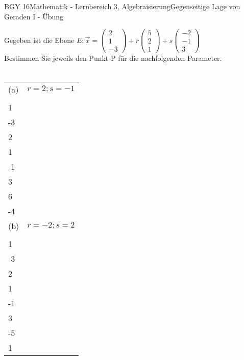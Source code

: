 \documentclass[oneside,openany,headings=optiontotoc,11pt,numbers=noenddot]{scrreprt}
\begin{document}
	\begin{worksheet}{BGY 16}{Mathematik - Lernbereich 3, Algebraisierung}{Gegenseitige Lage von Geraden I - Übung}
				
		\begin{framed}
			\noindent
			Gegeben ist die Ebene \(E: \vec{x} = \left(\begin{array}{c}2\\1\\-3\end{array}\right) + r\left(\begin{array}{c}5\\2\\1\end{array}\right) +s\left(\begin{array}{c}-2\\-1\\3\end{array}\right)\)\\
			Bestimmen Sie jeweils den Punkt P für die nachfolgenden Parameter.\\
			\hdashrule[0.5ex][x]{\textwidth}{0.1mm}{8mm 2pt}\\
			\begin{tabularx}{\textwidth}{lX}
				(a) & \(r=2; s= -1\)\\
				& \(\vec{x} = \left(\begin{array}{c}2\\1\\-3\end{array}\right) + 2*\left(\begin{array}{c}5\\2\\1\end{array}\right) -\left(\begin{array}{c}-2\\-1\\3\end{array}\right) = \left(\begin{array}{c}14\\6\\-4\end{array}\right)\)\\
				(b)& \(r=-2; s=2\)\\
				& \(\vec{x} = \left(\begin{array}{c}2\\1\\-3\end{array}\right) - 2*\left(\begin{array}{c}5\\2\\1\end{array}\right) +2\left(\begin{array}{c}-2\\-1\\3\end{array}\right) = \left(\begin{array}{c}-12\\-5\\1\end{array}\right)\)\\

\end{tabularx}
\end{framed}
\end{worksheet}
\end{document}
